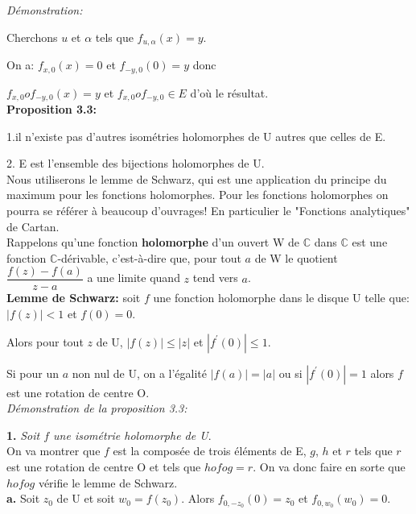 \documentclass[a4paper, 12pt, twoside]{book}
\begin{document}
 
 \textit{Démonstration:}\
 
 Cherchons $u$ et $\alpha$ tels que $f_{u,\alpha}(x)=y$. \
 
 On a: $f_{x,0}(x)=0$ et $f_{-y,0}(0)=y$ donc\
 
 
 $f_{x,0}of_{-y,0}(x)=y$ et  $f_{x,0}of_{-y,0}\in E$ d'où le résultat.\\
 
 \textbf{Proposition 3.3:}\
 
  1.il n'existe pas d'autres isométries holomorphes de U autres que celles de E.\
  
  2. E est l'ensemble des bijections holomorphes de U.\\
 


Nous utiliserons le lemme de Schwarz, qui est une application du principe du maximum pour les fonctions holomorphes. Pour les fonctions holomorphes on pourra se référer à beaucoup d'ouvrages! En particulier le "Fonctions analytiques" de Cartan. \\

\newpage 
Rappelons qu'une fonction \textbf{holomorphe} d'un ouvert W   de $\mathbb{C}$ dans $\mathbb{C}$ est une fonction  $\mathbb{C}$-dérivable, c'est-à-dire que, pour tout $a$ de W le quotient $\dfrac{f(z)-f(a)}{z-a}$ a une limite quand $z$ tend vers $a$.\\



 \textbf{Lemme de Schwarz:} soit $f$ une fonction holomorphe dans le disque U telle que: $|f(z)|<1$ et $f(0)=0$.\

Alors pour tout $z$ de U, $|f(z)|\leq |z|$ et $|f^{'}(0)|\leq 1$.\

Si pour un $a$ non nul de U, on a l'égalité $|f(a)|=|a|$ ou si $|f^{'}(0)|=1$ alors $f$ est une rotation de centre O. \\

\textit{Démonstration de la proposition 3.3:}\


\textbf{1.} \textit{Soit $f$ une isométrie holomorphe de U}. \\

On va montrer que $f$ est la composée de trois éléments de E, $g$, $h$ et $r$ tels que $r$ est une rotation de centre O et tels que $hofog=r$. On va donc faire en sorte que $hofog$ vérifie le lemme de Schwarz. \\

 \textbf{a.} Soit $z_{0}$ de U et soit $w_{0}=f(z_{0})$. Alors $f_{0,-z_{0}}(0)=z_{0}$ et $f_{0,w_{0}}(w_{0})=0$.\\
 
\end{document}
